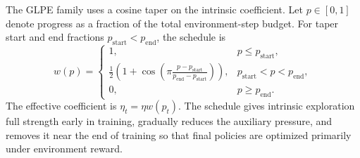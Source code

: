 The GLPE family uses a cosine taper on the intrinsic coefficient.
Let $p\in[0,1]$ denote progress as a fraction of the total environment-step budget.
For taper start and end fractions $p_{\mathrm{start}}<p_{\mathrm{end}}$, the schedule is
\begin{equation}
    w(p)=
    \begin{cases}
        1, & p\le p_{\mathrm{start}},\\
        \frac{1}{2}\left(1+\cos\!\left(\pi\frac{p-p_{\mathrm{start}}}{p_{\mathrm{end}}-p_{\mathrm{start}}}\right)\right), & p_{\mathrm{start}}<p<p_{\mathrm{end}},\\
        0, & p\ge p_{\mathrm{end}}.
    \end{cases}
\end{equation}
The effective coefficient is $\eta_t=\eta w(p_t)$.
The schedule gives intrinsic exploration full strength early in training, gradually reduces the auxiliary pressure, and removes it near the end of training so that final policies are optimized primarily under environment reward.